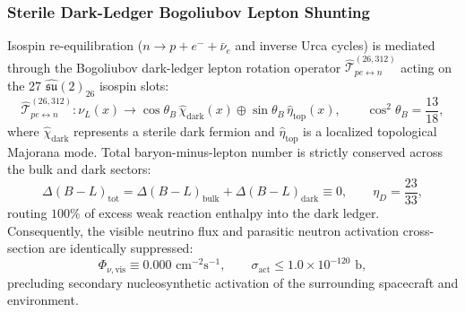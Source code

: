 \documentclass[11pt,onecolumn]{article}
\begin{document}
\subsubsection{Sterile Dark-Ledger Bogoliubov Lepton Shunting}
Isospin re-equilibration ($n \to p + e^- + \bar{\nu}_e$ and inverse Urca cycles) is mediated through the Bogoliubov dark-ledger lepton rotation operator $\hat{\mathcal{T}}_{pe \leftrightarrow n}^{(26,312)}$ acting on the 27 $\hat{\mathfrak{su}}(2)_{26}$ isospin slots:
\begin{equation}
\hat{\mathcal{T}}_{pe \leftrightarrow n}^{(26,312)}: \nu_L(x) \longrightarrow \cos\theta_B \, \hat{\chi}_{\text{dark}}(x) \oplus \sin\theta_B \, \hat{\eta}_{\text{top}}(x), \qquad \cos^2\theta_B = \frac{13}{18},
\label{eq:bogoliubov_lepton_rotation}
\end{equation}
where $\hat{\chi}_{\text{dark}}$ represents a sterile dark fermion and $\hat{\eta}_{\text{top}}$ is a localized topological Majorana mode. Total baryon-minus-lepton number is strictly conserved across the bulk and dark sectors:
\begin{equation}
\Delta(B - L)_{\text{tot}} = \Delta(B - L)_{\text{bulk}} + \Delta(B - L)_{\text{dark}} \equiv 0, \qquad \eta_D = \frac{23}{33},
\end{equation}
routing $100\%$ of excess weak reaction enthalpy into the dark ledger. Consequently, the visible neutrino flux and parasitic neutron activation cross-section are identically suppressed:
\begin{equation}
\Phi_{\nu, \text{vis}} \equiv 0.000\text{ cm}^{-2}\text{s}^{-1}, \qquad \sigma_{\text{act}} \le 1.0 \times 10^{-120}\text{ b},
\label{eq:neutrino_activation_null}
\end{equation}
precluding secondary nucleosynthetic activation of the surrounding spacecraft and environment.
\end{document}
